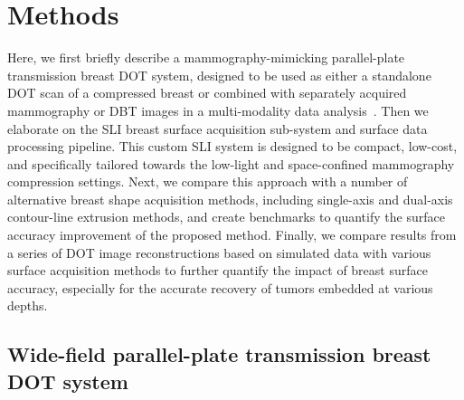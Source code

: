 \section{Methods}
\label{chap:omci:methods}
Here, we first briefly describe a mammography-mimicking parallel-plate transmission breast DOT system, designed to be used as either a standalone DOT scan of a compressed breast or combined with separately acquired mammography or DBT images in a multi-modality data analysis~\cite{Fang2009, Deng2015}. Then we elaborate on the SLI breast surface acquisition sub-system and surface data processing pipeline. This custom SLI system is designed to be compact, low-cost, and specifically tailored towards the low-light and space-confined mammography compression settings. Next, we compare this approach with a number of alternative breast shape acquisition methods, including single-axis and dual-axis contour-line extrusion methods, and create benchmarks to quantify the surface accuracy improvement of the proposed method. Finally, we compare results from a series of DOT image reconstructions based on simulated data with various surface acquisition methods to further quantify the impact of breast surface accuracy, especially for the accurate recovery of tumors embedded at various depths.

\subsection{Wide-field parallel-plate transmission breast DOT system}

